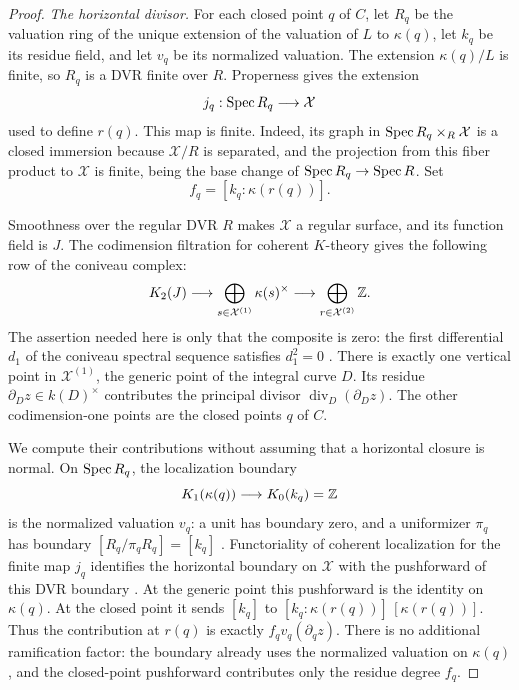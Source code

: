 \begin{proof}
\smallskip\noindent\emph{The horizontal divisor.}
For each closed point $q$ of $C$, let $R_q$ be the valuation ring of the
unique extension of the valuation of $L$ to $\kappa(q)$, let $k_q$ be its
residue field, and let $v_q$ be its normalized valuation.  The extension
$\kappa(q)/L$ is finite, so $R_q$ is a DVR finite over $R$.  Properness
gives the extension
\[
 j_q:\operatorname{Spec} R_q\longrightarrow\mathcal X
\]
used to define $r(q)$.  This map is finite.  Indeed, its graph in
$\operatorname{Spec} R_q\times_R\mathcal X$ is a closed immersion because
$\mathcal X/R$ is separated, and the projection from this fiber product
to $\mathcal X$ is finite, being the base change of $\operatorname{Spec} R_q\to\operatorname{Spec} R$.
Set
\[
 f_q=[k_q:\kappa(r(q))].
\]

Smoothness over the regular DVR $R$ makes $\mathcal X$ a regular surface,
and its function field is $J$.  The codimension filtration for coherent
$K$-theory gives the following row of the coniveau complex:
\begin{equation}\label{eq:surface-complex}
 K_2(J)\longrightarrow
 \bigoplus_{s\in\mathcal X^{(1)}}\kappa(s)^\times
 \longrightarrow
 \bigoplus_{r\in\mathcal X^{(2)}}\mathbb Z.
\end{equation}
The assertion needed here is only that the composite is zero: the first
differential $d_1$ of the coniveau spectral sequence satisfies $d_1^2=0$
\cite[\S7, Theorem~5.4 and equation~(5.5)]{Quillen1973Higher}.
There is exactly one vertical point in $\mathcal X^{(1)}$, the generic
point of the integral curve $D$.  Its residue
$\partial_Dz\in k(D)^\times$ contributes the principal divisor
$\operatorname{div}_D(\partial_Dz)$.  The other codimension-one points are
the closed points $q$ of $C$.

We compute their contributions without assuming that a horizontal closure
is normal.  On $\operatorname{Spec} R_q$, the localization boundary
\[
 K_1(\kappa(q))\longrightarrow K_0(k_q)=\mathbb Z
\]
is the normalized valuation $v_q$: a unit has boundary zero, and a
uniformizer $\pi_q$ has boundary $[R_q/\pi_qR_q]=[k_q]$
\cite[V.6.1.2 and V.(6.6)]{Weibel2013}.  Functoriality of coherent
localization for the finite map $j_q$ identifies the horizontal boundary
on $\mathcal X$ with the pushforward of this DVR boundary
\cite[\S7, paragraphs~2.7--2.8, Proposition~3.2 and paragraph~3.4]{Quillen1973Higher}.
At the generic point this pushforward is the identity on $\kappa(q)$.
At the closed point it sends $[k_q]$ to
$[k_q:\kappa(r(q))]\,[\kappa(r(q))]$.  Thus the contribution at $r(q)$ is
exactly $f_qv_q(\partial_qz)$.  There is no additional ramification
factor: the boundary already uses the normalized valuation on
$\kappa(q)$, and the closed-point pushforward contributes only the residue
degree $f_q$.


\end{proof}
